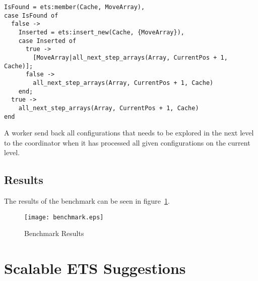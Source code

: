 \documentclass[aps,pre,preprint,nofootinbib]{revtex4}
\begin{document}
    \lstset{language=erlang, caption=Worker code that is interacting with ETS, label=li_erlang_ets_interaction} 
\begin{lstlisting} 
IsFound = ets:member(Cache, MoveArray),
case IsFound of
  false ->
    Inserted = ets:insert_new(Cache, {MoveArray}),
    case Inserted of
      true ->
        [MoveArray|all_next_step_arrays(Array, CurrentPos + 1, Cache)];
      false ->
        all_next_step_arrays(Array, CurrentPos + 1, Cache)
    end;
  true ->
    all_next_step_arrays(Array, CurrentPos + 1, Cache)
end
\end{lstlisting}
    
    A worker send back all configurations that needs to be explored in the next level to the coordinator when it has processed all given configurations on the current level.


\subsection{Results}

  The results of the benchmark can be seen in figure~\ref{fig:benchmark_results}.

\begin{figure}[htb]
\centering
\texttt{[image: benchmark.eps]}
\caption{Benchmark Results} 
\label{fig:benchmark_results}
\end{figure}


\section{Scalable ETS Suggestions}

\begin{thebibliography}{9}
\end{thebibliography}
\end{document}
